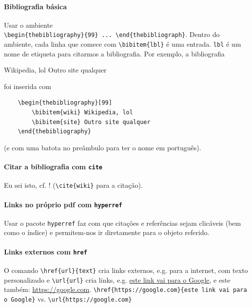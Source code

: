 \documentclass[11pt]{article}
\begin{document}
\paragraph{Bibliografia básica}
Usar o ambiente \\ \verb|\begin{thebibliography}{99} ... \end{thebibliograph}|.
Dentro do ambiente, cada linha que comece com \verb|\bibitem{lbl}| é uma entrada.
\texttt{lbl} é um nome de etiqueta para citarmos a bibliografia. Por exemplo,
a bibliografia
\begin{thebibliography}{99}
     Wikipedia, lol
     Outro site qualquer
\end{thebibliography}
foi inserida com
\begin{verbatim}
    \begin{thebibliography}[99]
        \bibitem{wiki} Wikipedia, lol
        \bibitem{site} Outro site qualquer
    \end{thebibliography}
\end{verbatim}
(e com uma batota no preâmbulo para ter o nome em português).

\paragraph{Citar a bibliografia com \texttt{cite}}
Eu sei isto, cf. \cite{wiki}! (\verb|\cite{wiki}| para a citação).

\paragraph{Links no próprio pdf com \texttt{hyperref}}
Usar o pacote \texttt{hyperref} faz com que citações e referências sejam
clicáveis (bem como o índice) e permitem-nos ir diretamente para o objeto
referido.

\paragraph{Links externos com \texttt{href}}
O comando \verb|\href{url}{text}| cria links externos, e.g. para a internet,
com texto personalizado e \verb|\url{url}| cria links, e.g.
\href{https://google.com}{este link vai para o Google}, e este também:
\url{https://google.com}.
\verb|\href{https://google.com}{este link vai para o Google}| vs.
\verb|\url{https://google.com}|
\end{document}
